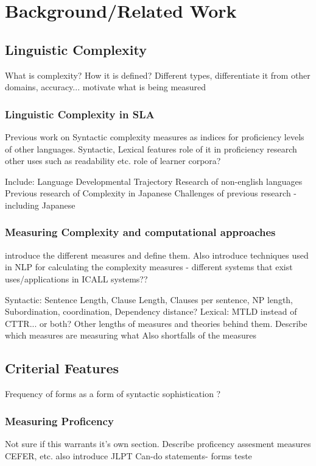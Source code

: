 \chapter{Background/Related Work}

\section{Linguistic Complexity}
What is complexity? How it is defined? Different types, differentiate it from other domains, accuracy...
motivate what is being measured


\subsection{Linguistic Complexity in SLA}
Previous work on Syntactic complexity measures as indices for proficiency levels of other languages.
Syntactic, Lexical features
role of it in proficiency research
other uses such as readability etc.
role of learner corpora?

Include:
Language Developmental Trajectory
Research of non-english languages
Previous research of Complexity in Japanese
Challenges of previous research - including Japanese


\subsection{Measuring Complexity and computational approaches}
introduce the different measures and define them. Also introduce techniques used in NLP for calculating the complexity
measures - different systems that exist
uses/applications in ICALL systems??

Syntactic:
Sentence Length, Clause Length, Clauses per sentence, NP length, Subordination, coordination, Dependency distance?
Lexical:
MTLD instead of CTTR... or both?
Other lengths of measures and theories behind them. Describe which measures are measuring what Also shortfalls of the
measures

\section{Criterial Features}

Frequency of forms as a form of syntactic sophistication ? \cite{Ellis2004}


\subsection{Measuring Proficency}
Not sure if this warrants it's own section. Describe proficency assesment measures CEFER, etc. also introduce JLPT
Can-do statements- forms teste

